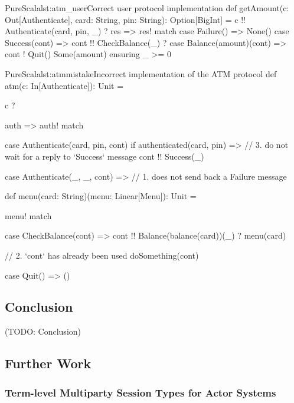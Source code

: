 \documentclass[a4paper,twoside]{article}
\newcommand{\TODO}[1]{\textcolor{YellowOrange}{(TODO: #1)}} %
\begin{document}
\begin{Code}{PureScala}{lst:atm_user}{Correct user protocol implementation}
def getAmount(c: Out[Authenticate], card: String, pin: String): Option[BigInt] = {
  c !! Authenticate(card, pin, _) ? { res =>
    res! match {
      case Failure() => None()
      case Success(cont) => cont !! CheckBalance(_) ? {
        case Balance(amount)(cont) =>
          cont ! Quit()
          Some(amount)
      }
    }
  }
} ensuring { _ >= 0 }
\end{Code}

\begin{Code}{PureScala}{lst:atmmistake}{Incorrect implementation of the ATM protocol}
def atm(c: In[Authenticate]): Unit = {
  c ? { auth => auth! match {  
    case Authenticate(card, pin, cont) if authenticated(card, pin) =>
      // 3. do not wait for a reply to `Success` message
      cont !! Success(_)
  
    case Authenticate(_, _, cont) =>
      // 1. does not send back a Failure message

  } }
}

def menu(card: String)(menu: Linear[Menu]): Unit = {
  menu! match {
    case CheckBalance(cont) =>
      cont !! Balance(balance(card))(_) ? menu(card)
      
      // 2. `cont` has already been used
      doSomething(cont)

    case Quit() => ()
  }
}
\end{Code}

%

\subsection{Conclusion}

\TODO{Conclusion}

\subsection{Further Work}

\subsubsection*{Term-level Multiparty Session Types for Actor Systems}
\end{document}
